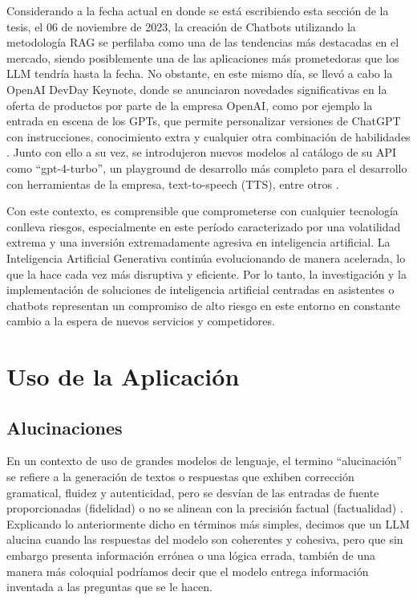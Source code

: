 Considerando a la fecha actual en donde se está escribiendo esta sección de la tesis, el 06 de noviembre de 2023, la creación de Chatbots utilizando la metodología RAG se perfilaba como 
una de las tendencias más destacadas en el mercado, siendo posiblemente una de las aplicaciones más prometedoras que los LLM tendría hasta la fecha. 
No obstante, en este mismo día, se llevó a cabo la OpenAI DevDay Keynote, donde se anunciaron novedades significativas en la oferta de productos por parte de la empresa OpenAI, como por ejemplo la entrada en 
escena de los GPTs, que permite personalizar versiones de ChatGPT con instrucciones, conocimiento extra y cualquier otra combinación 
de habilidades \cite{openai2}. Junto con ello a su vez, se introdujeron nuevos modelos al catálogo de su API como ``gpt-4-turbo'', un playground de desarrollo más completo para el desarrollo con herramientas de la empresa, 
text-to-speech (TTS), entre otros \cite{openai3}.

Con este contexto, es comprensible que comprometerse con cualquier tecnología conlleva riesgos, especialmente en este período caracterizado por una 
volatilidad extrema y una inversión extremadamente agresiva en inteligencia artificial. La Inteligencia Artificial Generativa 
continúa evolucionando de manera acelerada, lo que la hace cada vez más disruptiva y eficiente. Por lo tanto, la investigación 
y la implementación de soluciones de inteligencia artificial centradas en asistentes o chatbots representan un compromiso de alto 
riesgo en este entorno en constante cambio a la espera de nuevos servicios y competidores.


\newpage

\section{Uso de la Aplicación}

\subsection{Alucinaciones}

En un contexto de uso de grandes modelos de lenguaje, el termino ``alucinación'' se refiere a la generación de textos o respuestas que exhiben corrección gramatical, fluidez y autenticidad,
pero se desvían de las entradas de fuente proporcionadas (fidelidad) o no se alinean con la precisión factual (factualidad) \cite{alucionacion1}.
Explicando lo anteriormente dicho en términos más simples, decimos que un LLM alucina cuando las respuestas del modelo son coherentes y cohesiva, pero que sin embargo presenta información errónea o una lógica errada, también de una manera más coloquial podríamos decir que el modelo entrega información inventada a las preguntas que se le hacen.   

